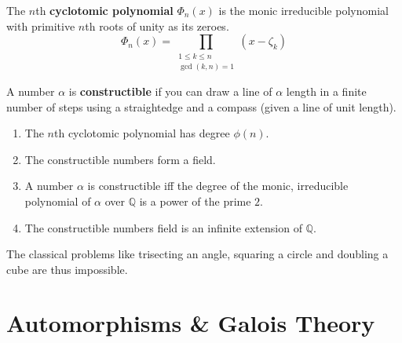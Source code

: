 \begin{definition}
	The $n$th \textbf{cyclotomic polynomial} $\Phi_n(x)$ is the monic irreducible polynomial with primitive $n$th roots of unity as its zeroes.
	$$ \Phi_n(x) = \prod_{\substack{1 \le k \le n \\ \gcd(k,n)=1}} \!\!\!\!\!\left(x-\zeta_k\right)$$
\end{definition}

\begin{definition}
	A number $\alpha$ is \textbf{constructible} if you can draw a line of $\alpha$ length in a finite number of steps using a straightedge and a compass (given a line of unit length).
\end{definition}

\begin{enumerate}
	\item The $n$th cyclotomic polynomial has degree $\phi(n)$.
	\item The constructible numbers form a field.
	\item A number $\alpha$ is constructible iff the degree of the monic, irreducible polynomial of $\alpha$ over $\mathbb{Q}$ is a power of the prime $2$.
	\item The constructible numbers field is an infinite extension of $\mathbb{Q}$.
\end{enumerate}
	The classical problems like trisecting an angle, squaring a circle and doubling a cube are thus impossible.


\section{Automorphisms \& Galois Theory}
